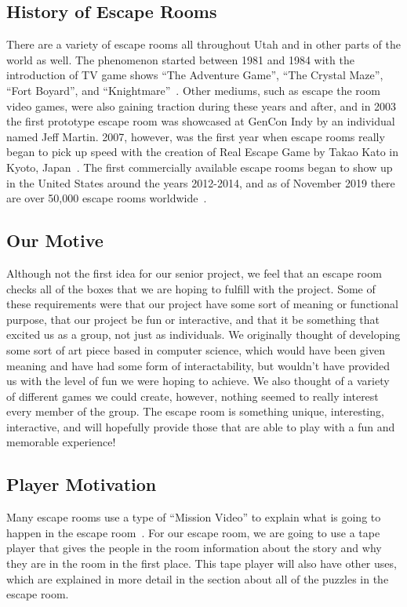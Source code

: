 \documentclass[conference]{IEEEtran}
\begin{document}
\subsection*{History of Escape Rooms}
There are a variety of escape rooms all throughout Utah and in other parts of the world as well. The phenomenon
started between 1981 and 1984 with the introduction of TV game shows ``The Adventure Game'', ``The Crystal Maze'',
``Fort Boyard'', and ``Knightmare''~\cite{wikipediaEscapeRoom}. Other mediums, such as escape the room video games, were also gaining traction
during these years and after, and in 2003 the first prototype escape room was showcased at GenCon Indy by
an individual named Jeff Martin. 2007, however, was the first year when escape rooms really began to pick up speed
with the creation of Real Escape Game by Takao Kato in Kyoto, Japan~\cite{whatIsAnEscapeRoom}. The first commercially available escape rooms
began to show up in the United States around the years 2012-2014, and as of November 2019 there are over 50,000 escape
rooms worldwide~\cite{wikipediaEscapeRoom}.

\subsection*{Our Motive}
Although not the first idea for our senior project, we feel that an escape room checks all of the
boxes that we are hoping to fulfill with the project. Some of these requirements were that our project
have some sort of meaning or functional purpose, that our project be fun or interactive, and that
it be something that excited us as a group, not just as individuals. We originally thought of developing some
sort of art piece based in computer science, which would have been given meaning and have had some form of
interactability, but wouldn't have provided us with the level of fun we were hoping to achieve.
We also thought of a variety of different games we could create, however, nothing seemed to really interest
every member of the group. The escape room is something unique, interesting, interactive, and will hopefully
provide those that are able to play with a fun and memorable experience!

\subsection*{Player Motivation}
Many escape rooms use a type of ``Mission Video'' to explain what is going to happen in the escape room~\cite{whatIsAnEscapeRoom}.
For our escape room, we are going to use a tape player that gives the people in the room information about
the story and why they are in the room in the first place. This tape player will also have other uses, which are
explained in more detail in the section about all of the puzzles in the escape room.
\end{document}
